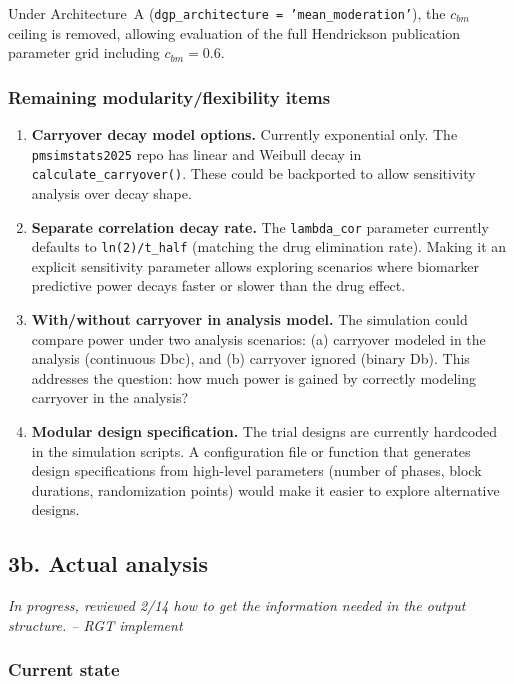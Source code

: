 \documentclass[11pt]{article}
\begin{document}
Under Architecture~A
(\texttt{dgp\_architecture = 'mean\_moderation'}), the
$c_{bm}$ ceiling is removed, allowing evaluation of the full
Hendrickson publication parameter grid including
$c_{bm} = 0.6$.

\subsubsection{Remaining modularity/flexibility items}

\begin{enumerate}
  \item \textbf{Carryover decay model options.} Currently exponential
    only. The \texttt{pmsimstats2025} repo has linear and Weibull
    decay in \texttt{calculate\_carryover()}. These could be
    backported to allow sensitivity analysis over decay
    shape.
  \item \textbf{Separate correlation decay rate.} The \texttt{lambda\_cor}
    parameter currently defaults to \texttt{ln(2)/t\_half}
    (matching the drug elimination rate). Making it an
    explicit sensitivity parameter allows exploring
    scenarios where biomarker predictive power decays
    faster or slower than the drug effect.
  \item \textbf{With/without carryover in analysis model.} The
    simulation could compare power under two analysis
    scenarios: (a) carryover modeled in the analysis
    (continuous Dbc), and (b) carryover ignored (binary
    Db). This addresses the question: how much power is
    gained by correctly modeling carryover in the analysis?
  \item \textbf{Modular design specification.} The trial designs are
    currently hardcoded in the simulation scripts. A
    configuration file or function that generates design
    specifications from high-level parameters (number of
    phases, block durations, randomization points) would
    make it easier to explore alternative designs.
\end{enumerate}

\subsection{3b. Actual analysis}

\textit{In progress, reviewed 2/14 how to get the information
needed in the output structure. -- RGT implement}

\subsubsection{Current state}
\end{document}

